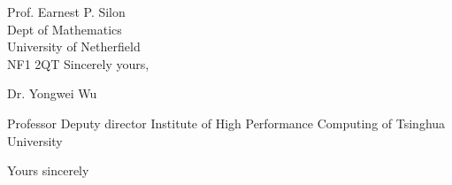 \documentclass[xelatex]{styles/rec-letter-3} %
\begin{document}
\begin{letter}{
Prof. Earnest P. Silon \\  
Dept of Mathematics\\
University of Netherfield\\
NF1 2QT}
Sincerely yours,


Dr. Yongwei Wu

Professor
Deputy director
Institute of High Performance Computing of Tsinghua University

\closing{Yours sincerely} %
\end{letter}
\end{document}
